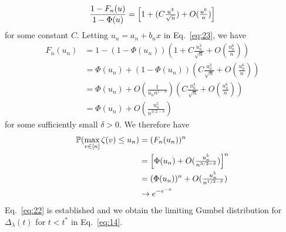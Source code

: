 \documentclass[final]{IEEEtran}
\theoremstyle{definition}
\begin{document}
\begin{IEEEproof}
    \begin{equation}
      \label{eq:23}
      \frac{1 - F_{n}(u)}{1 - \Phi(u)} = \Bigl[1 + (C\tfrac{u^{3}}{\sqrt{n}}) + O(\tfrac{u^{6}}{n}) \Bigr]
    \end{equation}
    for some constant $C$. Letting $u_n = a_n + b_n x$ in
    Eq.~\eqref{eq:23}, we have
    \begin{equation*}
      \begin{split}
     F_n(u_n) &= 1 - (1 - \Phi(u_n))(1 + C \tfrac{u_n^{3}}{\sqrt{n}} +
     O(\tfrac{u_n^{6}}{n})) \\
     &= \Phi(u_n) + (1 - \Phi(u_n))(C \tfrac{u_n^{3}}{\sqrt{n}} +
     O(\tfrac{u_n^6}{n})) \\
     &= \Phi(u_n) + O(\tfrac{1}{u_n n^{1- \delta}})(C \tfrac{u_n^{3}}{\sqrt{n}} +
     O(\tfrac{u_n^6}{n})) \\
     &= \Phi(u_n) + O(\tfrac{u_n^{5}}{n^{3/2 - \delta}})
     \end{split}
    \end{equation*}
    for some sufficiently small $\delta > 0$. We therefore have
    \begin{equation}
      \label{eq:25}
      \begin{split}
      \mathbb{P}(\max_{v \in [n]} \zeta(v) \leq u_n) &= (F_n(u_n))^{n} \\
      &= \Bigl[\Phi(u_n) + O(\tfrac{u_n^{5}}{n^{3/2 - \delta}})\Bigr]^{n} \\
      &= (\Phi(u_n))^{n} + O(\tfrac{u_n^{5}}{n^{1/2 - \delta}}) \\
      & \rightarrow e^{-e^{-x}} 
      \end{split}
    \end{equation}
    Eq.~\eqref{eq:22} is established and we obtain the limiting Gumbel distribution for
    $\Delta_{\lambda}(t)$ for $t < t^{*}$ in Eq.~\eqref{eq:14}.

\end{IEEEproof}
\end{document}
